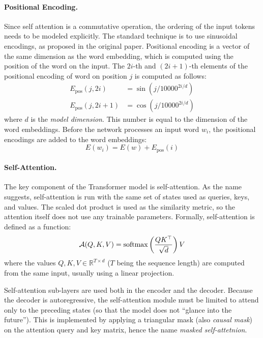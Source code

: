 \paragraph{Positional Encoding.} Since self attention is a commutative
operation, the ordering of the input tokens needs to be modeled explicitly.
The standard technique is to use sinusoidal encodings, as proposed in the
original paper. Positional encoding is a vector of the same dimension as the
word embedding, which is computed using the position of the word on the input.
The $2i$-th and $(2i+1)$-th elements of the positional encoding of word on
position $j$ is computed as follows:
%
\begin{equation}
  \begin{split}
    E_{\text{pos}}(j, 2i) &= \sin(j / 10000^{2i/d}) \\
    E_{\text{pos}}(j, 2i + 1) &= \cos(j / 10000^{2i/d})
  \end{split}
\end{equation}
%
where $d$ is the \emph{model dimension}. This number is equal to the dimension
of the word embeddings. Before the network processes an input word $w_i$, the
positional encodings are added to the word embeddings:
\begin{equation}
  E(w_i) = E(w) + E_{\text{pos}}(i)
\end{equation}

\paragraph{Self-Attention.} The key component of the Transformer model is
self-attention. As the name suggests, self-attention is run with the same set
of states used as queries, keys, and values. The scaled dot product is used as
the similarity metric, so the attention itself does not use any trainable
parameters. Formally, self-attention is defined as a function:
%
\begin{equation}
  \mathcal{A}(Q,K,V) = \operatorname*{softmax} \left( \frac{QK^\top}{\sqrt{d}} \right) V
  \label{eq:scaled-dot-product}
\end{equation}
%
where the values $Q, K, V \in \mathbb{R}^{T \times d}$ ($T$ being the sequence
length) are computed from the same input, usually using a linear projection.

Self-attention sub-layers are used both in the encoder and the decoder. Because
the decoder is autoregressive, the self-attention module must be limited to
attend only to the preceding states (so that the model does not ``glance into
the future''). This is implemented by applying a triangular mask (also
\emph{causal mask}) on the attention query and key matrix, hence the name
\emph{masked self-attetnion}.

